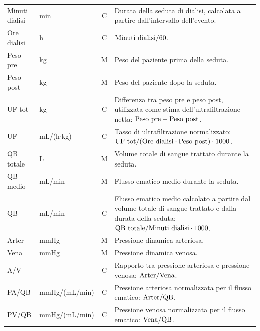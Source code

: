 \documentclass[a4paper,12pt]{report}
\begin{document}
\begin{longtable}{@{}>{\raggedright\arraybackslash}p{3.1cm}
                   >{\raggedright\arraybackslash}p{2.4cm}
                   c
                   >{\raggedright\arraybackslash}p{7.0cm}@{}}
\multicolumn{4}{@{}l}{\textbf{Variabili dialitiche (per seduta)}} \\
\midrule
Minuti dialisi & min & C & Durata della seduta di dialisi, calcolata a partire dall'intervallo dell'evento. \\
Ore dialisi & h & C & $\text{Minuti dialisi}/60$. \\
Peso pre & kg & M & Peso del paziente prima della seduta. \\
Peso post & kg & M & Peso del paziente dopo la seduta. \\
UF tot & kg & C & Differenza tra peso pre e peso post, utilizzata come stima dell'ultrafiltrazione netta: $\text{Peso pre} - \text{Peso post}$. \\
UF & mL/(h$\cdot$kg) & C & Tasso di ultrafiltrazione normalizzato: $\text{UF tot}/(\text{Ore dialisi}\cdot\text{Peso post})\cdot 1000$. \\
QB totale & L & M & Volume totale di sangue trattato durante la seduta. \\
QB medio & mL/min & M & Flusso ematico medio durante la seduta. \\
QB & mL/min & C & Flusso ematico medio calcolato a partire dal volume totale di sangue trattato e dalla durata della seduta: $\text{QB totale}/\text{Minuti dialisi}\cdot 1000$. \\
Arter & mmHg & M & Pressione dinamica arteriosa. \\
Vena & mmHg & M & Pressione dinamica venosa. \\
A/V & --- & C & Rapporto tra pressione arteriosa e pressione venosa: $\text{Arter}/\text{Vena}$. \\
PA/QB & mmHg\slash(mL/min) & C & Pressione arteriosa normalizzata per il flusso ematico: $\text{Arter}/\text{QB}$. \\
PV/QB & mmHg\slash(mL/min) & C & Pressione venosa normalizzata per il flusso ematico: $\text{Vena}/\text{QB}$. \\
\midrule


\end{longtable}
\end{document}
